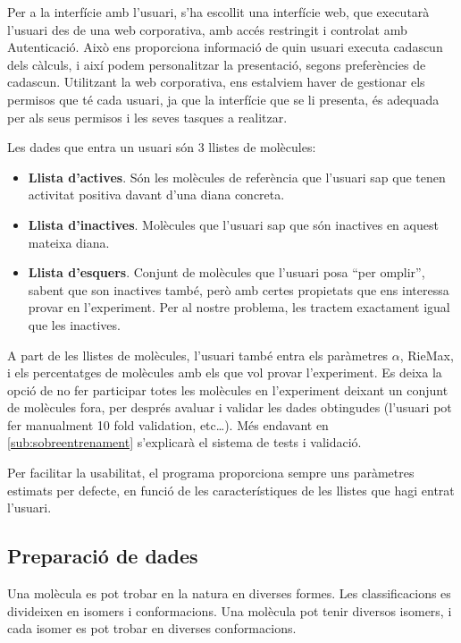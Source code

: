 Per a la interfície amb l'usuari, s'ha escollit una interfície web, que executarà
l'usuari des de una web corporativa, amb accés restringit i controlat amb
Autenticació.  Això ens proporciona informació de quin usuari executa cadascun
dels càlculs, i així podem personalitzar la presentació, segons preferències de
cadascun.  Utilitzant la web corporativa, ens estalviem haver de gestionar els
permisos que té cada usuari, ja que la interfície que se li presenta, és
adequada per als seus permisos i les seves tasques a realitzar.

Les dades que entra un usuari són 3 llistes de molècules:

\begin{itemize}
	\item \textbf{Llista d'actives}.  Són les molècules de referència que l'usuari sap
	que tenen activitat positiva davant d'una diana concreta.
	\item \textbf{Llista d'inactives}.  Molècules que l'usuari sap que són inactives en
	aquest mateixa diana.
	\item \textbf{Llista d'esquers}.  Conjunt de molècules que l'usuari posa ``per
	omplir'', sabent que son inactives també, però amb certes propietats que ens interessa provar en
	l'experiment.   Per al nostre problema, les tractem exactament igual que les inactives.

\end{itemize}

A part de les llistes de molècules, l'usuari també entra els paràmetres $\alpha$,
RieMax, i els percentatges de molècules amb els que vol provar l'experiment.  Es
deixa la opció de no fer participar totes les molècules en l'experiment deixant 
un conjunt de molècules fora, per després avaluar i validar les dades obtingudes
(l'usuari pot fer manualment 10 fold validation, etc\dots).  Més endavant en 
\ref{sub:sobreentrenament} s'explicarà el sistema de tests i validació.

Per facilitar la usabilitat, el programa proporciona sempre uns paràmetres
estimats per defecte, en funció de les característiques de les llistes que hagi
entrat l'usuari. 

\subsection{Preparació de dades} %
\label{sub:preparacio de dades}
Una molècula es pot trobar en la natura en diverses formes.  Les classificacions
es divideixen en isomers i conformacions.  Una molècula pot tenir diversos
isomers, i cada isomer es pot trobar en  diverses conformacions.

